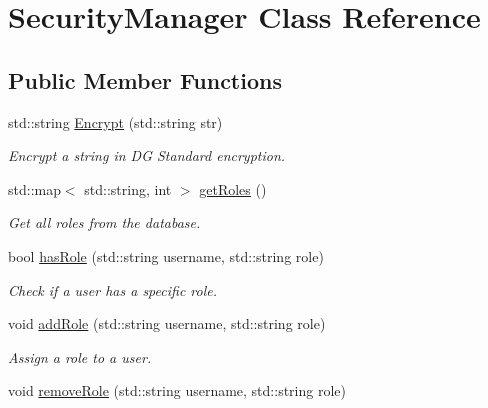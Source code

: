 \hypertarget{classSecurityManager}{\section{Security\-Manager Class Reference}
\label{classSecurityManager}
}
\subsection*{Public Member Functions}
\begin{DoxyCompactItemize}
\item 
std\-::string \hyperlink{classSecurityManager_acc4ef8e7685038735e83e73556a5f510}{Encrypt} (std\-::string str)
\begin{DoxyCompactList}\small\item\em Encrypt a string in D\-G Standard encryption. \end{DoxyCompactList}\item 
std\-::map$<$ std\-::string, int $>$ \hyperlink{classSecurityManager_afe3d50265be58ec179058feadd9902a6}{get\-Roles} ()
\begin{DoxyCompactList}\small\item\em Get all roles from the database. \end{DoxyCompactList}\item 
bool \hyperlink{classSecurityManager_a2950edc6463999ceca399d47023adddc}{has\-Role} (std\-::string username, std\-::string role)
\begin{DoxyCompactList}\small\item\em Check if a user has a specific role. \end{DoxyCompactList}\item 
\hypertarget{classSecurityManager_a9ebf385f13f1893bb36647605677043d}{void \hyperlink{classSecurityManager_a9ebf385f13f1893bb36647605677043d}{add\-Role} (std\-::string username, std\-::string role)}\label{classSecurityManager_a9ebf385f13f1893bb36647605677043d}

\begin{DoxyCompactList}\small\item\em Assign a role to a user. \end{DoxyCompactList}\item 
\hypertarget{classSecurityManager_a2d5b4923acbe73b0d21c5179deb7f17d}{void \hyperlink{classSecurityManager_a2d5b4923acbe73b0d21c5179deb7f17d}{remove\-Role} (std\-::string username, std\-::string role)}\label{classSecurityManager_a2d5b4923acbe73b0d21c5179deb7f17d}


\end{DoxyCompactItemize}
